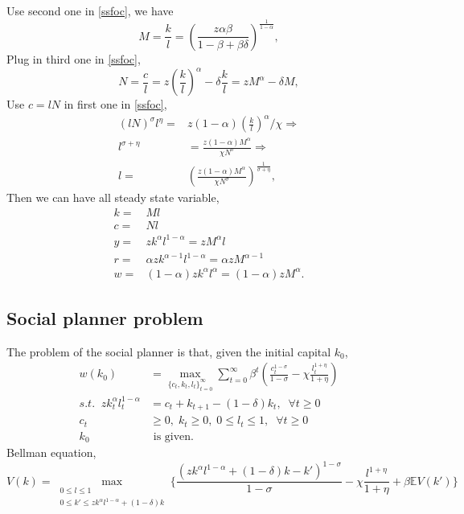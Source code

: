 \documentclass[12pt,notitlepage]{article}%
\numberwithin{equation}{section}
\begin{document}
			Use second one in \ref{ssfoc}, we have 
			\begin{equation*}
				M=\frac{k}{l}=\left(\frac{z\alpha \beta}{1-\beta +\beta \delta}\right)^{\frac{1}{1-\alpha}},
			\end{equation*}
			Plug in third one in \ref{ssfoc},
			\begin{equation*}
				N=\frac{c}{l}=z(\frac{k}{l})^{\alpha}-\delta \frac{k}{l}=zM^{\alpha}-\delta M,
			\end{equation*}
			Use $c=lN$ in first one in \ref{ssfoc},
			\begin{equation*}
			\begin{split}
				(lN)^{\sigma}l^{\eta}=&
				z(1-\alpha)(\frac{k}{l})^{\alpha}/\chi\Rightarrow\\
				l^{\sigma+\eta}&=\frac{z(1-\alpha)M^{\alpha}}{\chi N^{\sigma}} \Rightarrow\\
				l=&\left(\frac{z(1-\alpha)M^{\alpha}}{\chi N^{\sigma}}\right)^{\frac{1}{\sigma+\eta}},
			\end{split}
			\end{equation*}
			Then we can have all steady state variable,
			\begin{equation*}
			\begin{split}
				k=&Ml\\
				c=&Nl\\
				y=&zk^{\alpha}l^{1-\alpha}=zM^{\alpha}l\\
				r=&\alpha zk^{\alpha-1}l^{1-\alpha}=\alpha zM^{\alpha -1}\\
				w=&(1-\alpha)zk^{\alpha}l^{\alpha}=(1-\alpha)zM^{\alpha}.
			\end{split}
			\end{equation*}
		\subsection{Social planner problem}
			The problem of the social planner is that, given the initial capital $k_0$,
			\begin{equation}\label{SPP1}
				\begin{split}
					w( k_0)&=\max_{\{c_t, k_t, l_t \}_{t=0}^{\infty}}
					\sum_{t=0}^{\infty}
					\beta ^t(\frac{c_t^{1-\sigma}}{1-\sigma}-\chi \frac{l_t^{1+\eta}}{1+\eta})\\
					s.t. \;\;zk_t^{\alpha}l_t^{1-\alpha}&=c_t+k_{t+1}-(1-\delta)k_t, \;\;\forall t\geq 0\\
					c_t&\geq0,\;k_t\geq0,\;0\leq l_t\leq 1,  \;\;\forall t\geq 0\\
					k_0&\text{ is given.}
				\end{split}
			\end{equation}
			Bellman equation,
			\begin{equation}
				V(k)=\max_{\begin{smallmatrix}0\leq l\leq 1
					\\0\leq k'\leq zk^{\alpha}l^{1-\alpha}+(1-\delta)k\end{smallmatrix}}
					\{\frac{(zk^{\alpha}l^{1-\alpha}+(1-\delta)k-k')^{1-\sigma}}{1-\sigma}-\chi \frac{l^{1+\eta}}{1+\eta}+\beta \mathbb{E}V(k')\}
			\end{equation}

	\setcounter{table}{0}
	
	\bigskip
\end{document}
